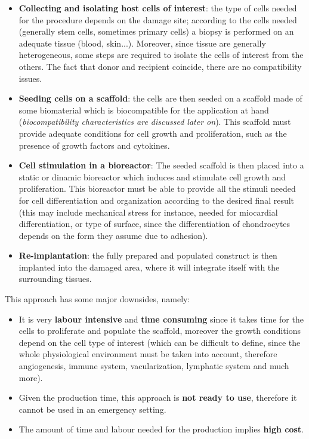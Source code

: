   \begin{multicols}{2}
    \begin{itemize}
      \item \textbf{Collecting and isolating host cells of interest}: the type of cells needed for the procedure depends on the damage site; according to the cells needed (generally stem cells, sometimes primary cells) a biopsy is performed on an adequate tissue (blood, skin...).
        Moreover, since tissue are generally heterogeneous, some steps are required to isolate the cells of interest from the others.
        The fact that donor and recipient coincide, there are no compatibility issues.
      \item \textbf{Seeding cells on a scaffold}: the cells are then seeded on a scaffold made of some biomaterial which is biocompatible for the application at hand (\textit{biocompatibility characteristics are discussed later on}).
        This scaffold must provide adequate conditions for cell growth and proliferation, such as the presence of growth factors and cytokines.
      \item \textbf{Cell stimulation in a bioreactor}: The seeded scaffold is then placed into a static or dinamic bioreactor which induces and stimulate cell growth and proliferation.
        This bioreactor must be able to provide all the stimuli needed for cell differentiation and organization according to the desired final result (this may include mechanical stress for instance, needed for miocardial differentiation, or type of surface, since the differentiation of chondrocytes depends on the form they assume due to adhesion).
      \item \textbf{Re-implantation}: the fully prepared and populated construct is then implanted into the damaged area, where it will integrate itself with the surrounding tissues.
    \end{itemize}
  \end{multicols}

  This approach has some major downsides, namely:

  \begin{multicols}{2}
    \begin{itemize}
      \item It is very \textbf{labour intensive} and \textbf{time consuming} since it takes time for the cells to proliferate and populate the scaffold, moreover the growth conditions depend on the cell type of interest (which can be difficult to define, since the whole physiological environment must be taken into account, therefore angiogenesis, immune system, vacularization, lymphatic system and much more).
      \item Given the production time, this approach is \textbf{not ready to use}, therefore it cannot be used in an emergency setting.
      \item The amount of time and labour needed for the production implies \textbf{high cost}.
    \end{itemize}
  \end{multicols}

